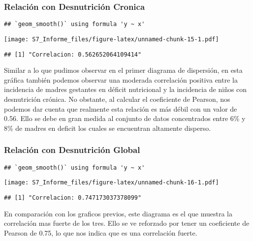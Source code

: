\documentclass[
]{article}
\begin{document}
\hypertarget{relaciuxf3n-con-desnutriciuxf3n-cronica}{%
\subsubsection{Relación con Desnutrición
Cronica}\label{relaciuxf3n-con-desnutriciuxf3n-cronica}}

\begin{verbatim}
## `geom_smooth()` using formula 'y ~ x'
\end{verbatim}

\texttt{[image: S7\_Informe\_files/figure-latex/unnamed-chunk-15-1.pdf]}

\begin{verbatim}
## [1] "Correlacion: 0.562652064109414"
\end{verbatim}

Similar a lo que pudimos observar en el primer diagrama de dispersión,
en esta gráfica también podemos observar una moderada correlación
positiva entre la incidencia de madres gestantes en déficit nutricional
y la incidencia de niños con desnutrición crónica. No obstante, al
calcular el coeficiente de Pearson, nos podemos dar cuenta que realmente
esta relación es más débil con un valor de 0.56. Ello se debe en gran
medida al conjunto de datos concentrados entre 6\% y 8\% de madres en
deficit los cuales se encuentran altamente disperso.

\hypertarget{relaciuxf3n-con-desnutriciuxf3n-global}{%
\subsubsection{Relación con Desnutrición
Global}\label{relaciuxf3n-con-desnutriciuxf3n-global}}

\begin{verbatim}
## `geom_smooth()` using formula 'y ~ x'
\end{verbatim}

\texttt{[image: S7\_Informe\_files/figure-latex/unnamed-chunk-16-1.pdf]}

\begin{verbatim}
## [1] "Correlacion: 0.747173037378099"
\end{verbatim}

En comparación con los graficos previos, este diagrama es el que muestra
la correlación mas fuerte de los tres. Ello se ve reforzado por tener un
coeficiente de Pearson de 0.75, lo que nos indica que es una correlación
fuerte.
\end{document}
